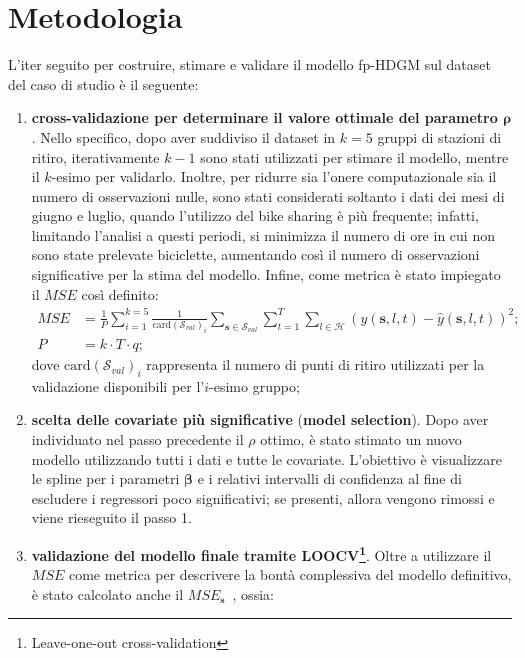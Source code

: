 \section{Metodologia}
L'iter seguito per costruire, stimare e validare il modello fp-HDGM sul dataset del caso di studio è il seguente:
\begin{enumerate}
	\item \textbf{cross-validazione per determinare il valore ottimale del parametro $\boldsymbol{\rho}$}. Nello specifico, dopo aver suddiviso il dataset in $k=5$ gruppi di stazioni di ritiro, iterativamente $k-1$ sono stati utilizzati per stimare il modello, mentre il $k$-esimo per validarlo. Inoltre, per ridurre sia l'onere computazionale sia il numero di osservazioni nulle, sono stati considerati soltanto i dati dei mesi di giugno e luglio, quando l'utilizzo del bike sharing è più frequente; infatti, limitando l'analisi a questi periodi, si minimizza il numero di ore in cui non sono state prelevate biciclette, aumentando così il numero di osservazioni significative per la stima del modello. Infine, come metrica è stato impiegato il $MSE$ così definito:
	\begin{equation}
		\begin{aligned}
			MSE &= \frac{1}{P}\sum_{i=1}^{k=5}\frac{1}{\text{card}(\mathcal{S}_{val})_i}\sum_{\mathbf{s}\in\mathcal{S}_{val}}^{}\sum_{t=1}^{T}\sum_{l\in\mathcal{H}}^{} (y(\mathbf{s}, l, t) - \hat{y}(\mathbf{s}, l, t))^2; \\
			P &= k\cdot T\cdot q;
		\end{aligned}
	\end{equation}
	dove $\text{card}(\mathcal{S}_{val})_i$ rappresenta il numero di punti di ritiro utilizzati per la validazione disponibili per l'$i$-esimo gruppo;
	\item \textbf{scelta delle covariate più significative} (\textbf{model selection}). Dopo aver individuato nel passo precedente il $\rho$ ottimo, è stato stimato un nuovo modello utilizzando tutti i dati e tutte le covariate. L'obiettivo è visualizzare le spline per i parametri $\boldsymbol{\beta}$ e i relativi intervalli di confidenza al fine di escludere i regressori poco significativi; se presenti, allora vengono rimossi e viene rieseguito il passo \num{1}.
	\item \textbf{validazione del modello finale tramite LOOCV\footnote{Leave-one-out cross-validation}}. Oltre a utilizzare il $MSE$ come metrica per descrivere la bontà complessiva del modello definitivo, è stato calcolato anche il $MSE_\mathbf{s}$~\citep{paper_f_HDGM}, ossia:

\end{enumerate}
